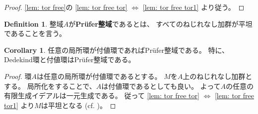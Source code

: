 \documentclass[uplatex]{jsarticle}
\theoremstyle{definition}
\newtheorem{prop}[prop]{Proposition}
\newtheorem{cor}[cor]{Corollary}
\newtheorem{defi}[defi]{Definition}
\theoremstyle{plain}
\newcommand{\dfn}{:\overset{\mbox{{\scriptsize def}}}{=}}
\begin{document}
\begin{proof}
  \autoref{lem: tor free}の
  \ref{lem: tor free tor} \(\Leftrightarrow\) \ref{lem: tor free tor1}
  より従う。
\end{proof}



%
%
%




\begin{defi}
  整域\(A\)が\textbf{Pr\"{u}fer整域}であるとは、
  すべてのねじれなし加群が平坦であることを言う。
\end{defi}



\begin{cor}
  任意の局所環が付値環であればPr\"{u}fer整域である。
  特に、Dedekind環と付値環はPr\"{u}fer整域である。
\end{cor}

\begin{proof}
  環\(A\)は任意の局所環が付値環であるとする。
  \(M\)を\(A\)上のねじれなし加群とする。
  局所化をすることで、\(A\)は付値環であるとしても良い。
  よって\(A\)の任意の有限生成イデアルは一元生成である。
  従って
  \ref{lem: tor free tor} \(\Leftrightarrow\) \ref{lem: tor free tor1}
  より\(M\)は平坦となる
  (cf. \cite[演習2.26]{AM})。
\end{proof}
\end{document}
